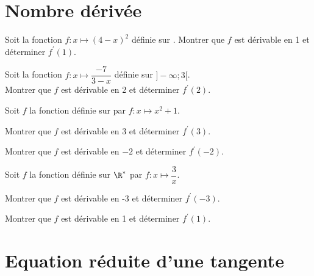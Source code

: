 \documentclass[11pt,a4paper]{article}  %
\begin{document}
	\graphicspath{{img_entrainement/}}
	
	\begin{center}
		
		
	\end{center}

\section*{Nombre dérivée}

\exercice{} 

Soit la fonction $f: x \mapsto(4-x)^2$ définie sur \R. Montrer que $f$ est dérivable en 1 et déterminer $f^{\prime}(1)$.

\exercice{}

Soit la fonction $f: x \mapsto\dfrac{-7}{3-x}$ définie sur $]-\infty;3[$.\\
Montrer que $f$ est dérivable en 2 et déterminer $f^{\prime}(2)$.

\exercice{}

Soit $f$ la fonction définie sur \R par $f: x \mapsto x^2+1$.
\begin{enumMet}
	\item Montrer que $f$  est dérivable en 3 et déterminer $f^{\prime}(3)$.
	\item Montrer que $f$ est dérivable en $-2$ et déterminer $f^{\prime}(-2)$.
\end{enumMet}

\exercice{}

Soit $f$ la fonction définie sur $\R^*$ par $f: x \mapsto \dfrac{3}{x}$.
\begin{enumMet}
	\item Montrer que $f$  est dérivable en -3 et déterminer $f^{\prime}(-3)$.
	\item Montrer que $f$ est dérivable en 1 et déterminer $f^{\prime}(1)$.
\end{enumMet}

\section*{Equation réduite d'une tangente}
\end{document}
